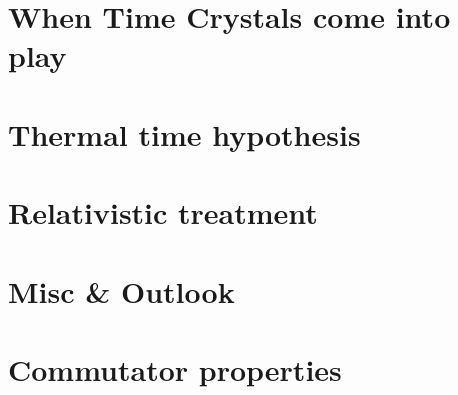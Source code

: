 \iftodo
\chapter{When Time Crystals come into play}

\fi

\iftodo
\chapter{Thermal time hypothesis}

\fi

\chapter{Relativistic treatment}


\iftodo
\chapter{Misc \& Outlook}

\fi

\appendix
\chapter{Commutator properties}


\printbibliography[heading=bibintoc]


